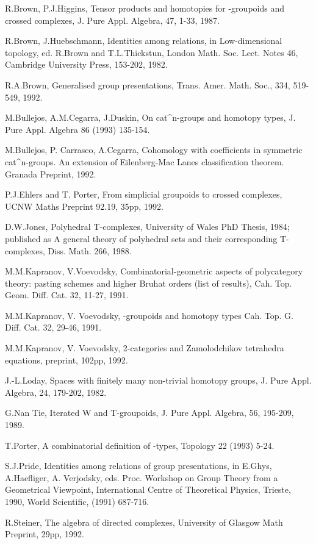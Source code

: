 R.Brown, P.J.Higgins, Tensor products and homotopies  for
\omega -groupoids  and  crossed complexes, J. Pure Appl.
Algebra, 47, 1-33, 1987. 

R.Brown, J.Huebschmann, Identities among relations,  in
Low-dimensional  topology, ed. R.Brown and T.L.Thickstun, London
Math. Soc. Lect. Notes   46, Cambridge University Press,
153-202, 1982. 

R.A.Brown, Generalised group presentations, Trans. Amer.
Math. Soc., 334, 519-549, 1992.  

M.Bullejos, A.M.Cegarra, J.Duskin, On cat^{n}-groups and
homotopy types, J. Pure Appl. Algebra 86 (1993) 135-154. 

M.Bullejos, P. Carrasco, A.Cegarra, Cohomology with
coefficients in symmetric cat^{n}-groups. An extension of
Eilenberg-Mac Lanes classification theorem. Granada Preprint,
1992.  

P.J.Ehlers and T. Porter, From simplicial groupoids to crossed
complexes,  UCNW Maths Preprint 92.19, 35pp, 1992.  

D.W.Jones, Polyhedral T-complexes, University of  Wales  PhD
Thesis,  1984;  published  as  A general theory of
polyhedral sets and their corresponding T-complexes,
Diss. Math. 266, 1988. 

M.M.Kapranov, V.Voevodsky, Combinatorial-geometric aspects of
polycategory theory: pasting schemes and higher Bruhat orders
(list of  results), Cah. Top. Geom. Diff. Cat. 32, 11-27,
1991. 

M.M.Kapranov, V. Voevodsky, \infty -groupoids  and  homotopy
types  Cah.  Top. G\eom. Diff. Cat. 32, 29-46, 1991. 

M.M.Kapranov, V.  Voevodsky,  2-categories  and  Zamolodchikov
tetrahedra  equations, preprint, 102pp, 1992. 

J.-L.Loday, Spaces with finitely many  non-trivial  homotopy
groups,  J. Pure Appl. Algebra, 24, 179-202, 1982. 

G.Nan Tie, Iterated  W and  T-groupoids,  J.  Pure  Appl.
Algebra,  56, 195-209, 1989.

T.Porter, A combinatorial definition of \infty -types, Topology 22
(1993) 5-24. 

S.J.Pride, Identities among relations of group  presentations,
in  E.Ghys, A.Haefliger, A. Verjodsky, eds. Proc. Workshop on
Group Theory from  a  Geometrical Viewpoint, International
Centre  of  Theoretical  Physics, Trieste, 1990, World
Scientific, (1991) 687-716.  

R.Steiner, The algebra of directed complexes, University of
Glasgow  Math Preprint, 29pp, 1992. 

